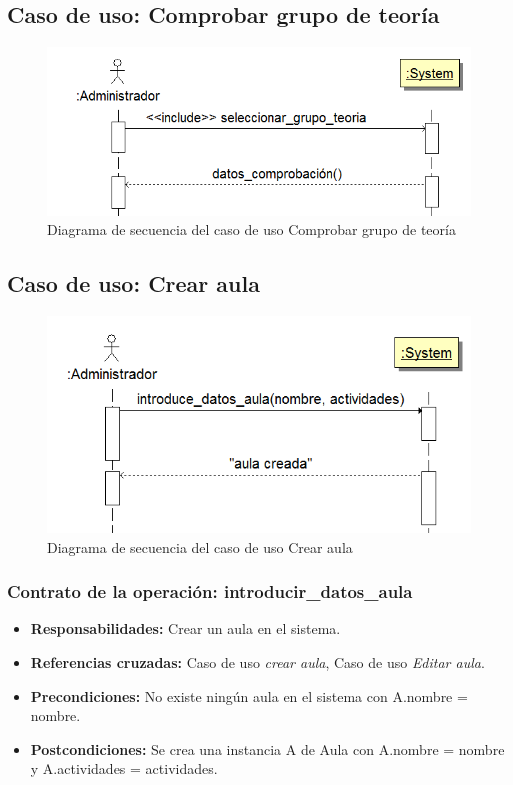 \documentclass{book}
\begin{document}
\subsection{Caso de uso: Comprobar grupo de teoría}
\begin{figure}[H] 
  \label{comportamiento-comprobar-grupo} 
	\begin{center}
    \includegraphics[scale=0.5]{./secuencia-comprobar-grupo.png}
  \end{center}
\caption{Diagrama de secuencia del caso de uso Comprobar grupo de teoría}
\end{figure}

\subsection{Caso de uso: Crear aula}

\begin{figure}[H] 
  \label{comportamiento-crear-aula} 
	\begin{center}
    \includegraphics[scale=0.5]{./secuencia-crear-aula.png}
  \end{center}
\caption{Diagrama de secuencia del caso de uso Crear aula}
\end{figure}

\subsubsection{Contrato de la operación: introducir\_datos\_aula}
\begin{itemize}
\item {\bf Responsabilidades:} Crear un aula en el sistema.
\item {\bf Referencias cruzadas:} Caso de uso {\em crear aula}, Caso de uso {\em Editar aula}.
\item {\bf Precondiciones:} No existe ningún aula en el sistema con A.nombre = nombre.
\item {\bf Postcondiciones:} Se crea una instancia A de Aula con A.nombre = nombre y A.actividades = actividades.
\end{itemize}
\end{document}
